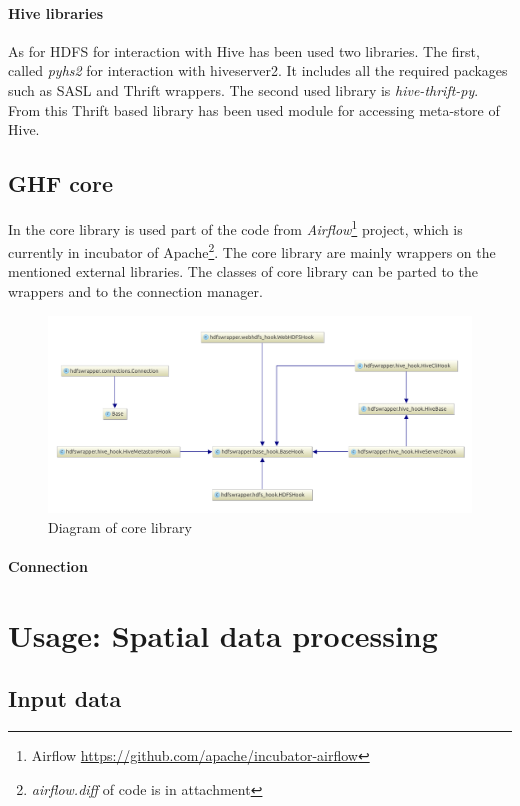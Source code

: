 \documentclass[a4paper,12pt,oneside]{report}
\begin{document}
\paragraph{Hive libraries}
As for HDFS for interaction with Hive has been used two libraries. The first, called \textit{pyhs2} for interaction with hiveserver2. It includes all the required packages such as SASL and Thrift wrappers. The second used library is \textit{hive-thrift-py}. From this Thrift based library has been used module for accessing meta-store of Hive.

\subsection{GHF core}
In the core library is used part of the code from \textit{Airflow}\footnote{Airflow \url{https://github.com/apache/incubator-airflow}} project, which is currently in incubator of Apache\footnote{\textit{airflow.diff} of code is in attachment}. The core library are mainly wrappers on the mentioned external libraries. The classes of core library can be parted to the wrappers and to the connection manager. 

\begin{figure}[!htbp]
   \centering
   \includegraphics[width=1\textwidth]{./img/diag1_small.pdf}
   \caption[Core diagram]{\centering Diagram of core library}
\end{figure} 

\paragraph{Connection}
 

\section{Usage: Spatial data processing}\label{sec:usage_spatial}
	\subsection{Input data}
\end{document}
